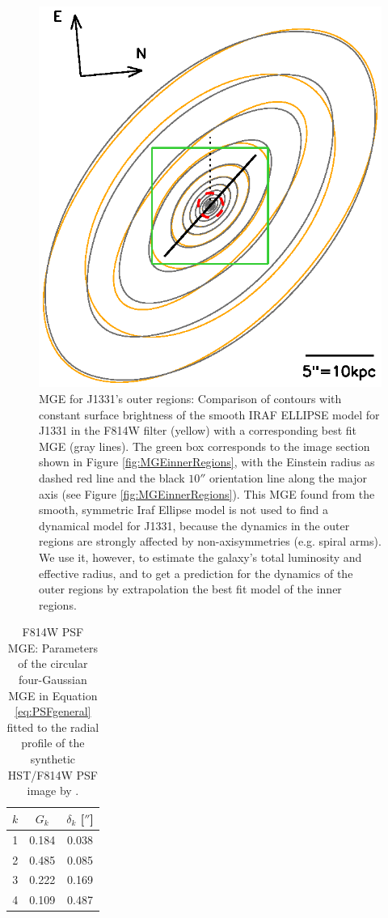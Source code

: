 \begin{figure}
\centering
\includegraphics[width=0.8\columnwidth]{fig/1331F814W_MGE_disk_L.ps}
\caption{MGE for J1331's outer regions: Comparison of contours with constant surface brightness of the smooth IRAF ELLIPSE  model for J1331 in the F814W filter (yellow) with a corresponding best fit MGE (gray lines). The green box corresponds to the image section shown in Figure \ref{fig:MGEinnerRegions}, with the Einstein radius as dashed red line and the black $10''$ orientation line along the major axis (see Figure \ref{fig:MGEinnerRegions}). This MGE found from the smooth, symmetric Iraf Ellipse \Wilma{[TO DO]} model is not used to find a dynamical model for J1331, because the dynamics in the outer regions are strongly affected by non-axisymmetries (e.g. spiral arms). We use it, however, to estimate the galaxy's total luminosity and effective radius, and to get a prediction for the dynamics of the outer regions by extrapolation the best fit model of the inner regions.}
\label{fig:MGEouterRegions}
\end{figure}


\begin{table}
\centering
\caption{F814W PSF MGE: Parameters of the circular four-Gaussian MGE in Equation \ref{eq:PSFgeneral} fitted to the radial profile of the synthetic HST/F814W PSF image by \Wilma{[TO DO: WHO???]}.}
\begin{tabular}{ccc}
\hline
$k$ & $G_k$ & $\delta_k$ [$''$] \\\hline
1 & 0.184 & 0.038\\
2 & 0.485 & 0.085\\
3 & 0.222 & 0.169\\
4 & 0.109 & 0.487\\\hline
\end{tabular}
\label{tab:PSFMGEF814W}
\end{table}

